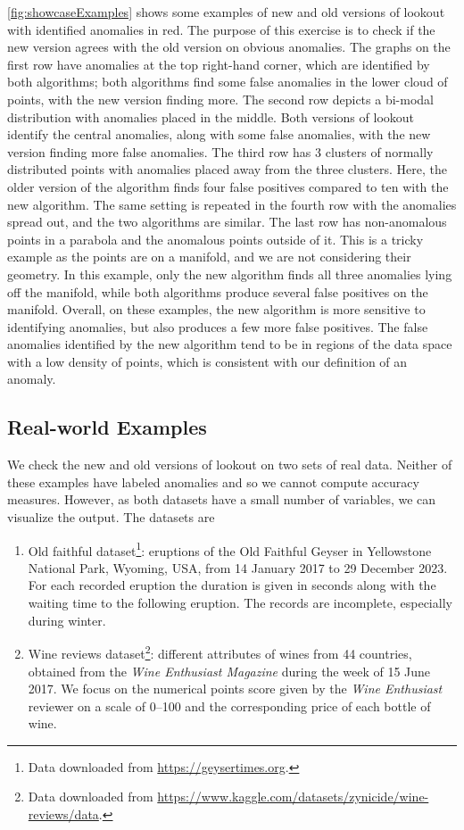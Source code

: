 \cref{fig:showcaseExamples} shows some examples of new and old versions of lookout with identified anomalies in red. The purpose of this exercise is to check if the new version agrees with the old version on obvious anomalies. The graphs on the first row have anomalies at the top right-hand corner, which are identified by both algorithms; both algorithms find some false anomalies in the lower cloud of points, with the new version finding more. The second row depicts a bi-modal distribution with anomalies placed in the middle. Both versions of lookout identify the central anomalies, along with some false anomalies, with the new version finding more false anomalies. The third row has 3 clusters of normally distributed points with anomalies placed away from the three clusters. Here, the older version of the algorithm finds four false positives compared to ten with the new algorithm. The same setting is repeated in the fourth row with the anomalies spread out, and the two algorithms are similar. The last row has non-anomalous points in a parabola and the anomalous points outside of it. This is a tricky example as the points are on a manifold, and we are not considering their geometry. In this example, only the new algorithm finds all three anomalies lying off the manifold, while both algorithms produce several false positives on the manifold. Overall, on these examples, the new algorithm is more sensitive to identifying anomalies, but also produces a few more false positives. The false anomalies identified by the new algorithm tend to be in regions of the data space with a low density of points, which is consistent with our definition of an anomaly.

\subsection{Real-world Examples}

We check the new and old versions of lookout on two sets of real data. Neither of these examples have labeled anomalies and so we cannot compute accuracy measures. However, as both datasets have a small number of variables, we can visualize the output. The datasets are
\begin{enumerate}
  \item Old faithful dataset\footnote{Data downloaded from \url{https://geysertimes.org}.}: eruptions of the Old Faithful Geyser in Yellowstone National Park, Wyoming, USA, from 14 January 2017 to 29 December 2023. For each recorded eruption the duration is given in seconds along with the waiting time to the following eruption. The records are incomplete, especially during winter.
  \item Wine reviews dataset\footnote{Data downloaded from \url{https://www.kaggle.com/datasets/zynicide/wine-reviews/data}.}: different attributes of wines from 44 countries, obtained from the \emph{Wine Enthusiast Magazine} during the week of 15 June 2017. We focus on the numerical points score given by the \emph{Wine Enthusiast} reviewer on a scale of 0--100 and the corresponding price of each bottle of wine.
\end{enumerate}

